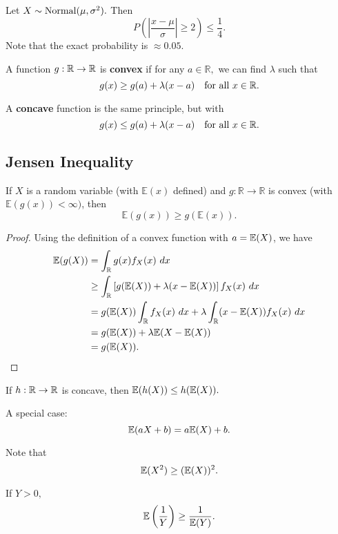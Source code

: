 \begin{eg}
Let $X\sim \operatorname*{Normal}(\mu,\sigma^2).$ Then 
$$
P\left(\left|\frac{x-\mu}{\sigma}\right| \geq 2\right) \leq \frac14.
$$
Note that the exact probability is $\approx 0.05$.
\end{eg}

\begin{definition}
A function $g:\mathbb R \to \mathbb R$ is \textbf{convex} if for any $a\in \mathbb R,$ we can find $\lambda$ such that
$$
g(x)\geq g(a)+\lambda(x-a) \quad \text{for all } x\in \mathbb R.
$$
\end{definition}
A \textbf{concave} function is the same principle, but with 
$$g(x)\leq g(a)+\lambda(x-a) \quad \text{for all } x\in \mathbb R.$$


\subsection{Jensen Inequality}
\begin{theorem}
If $X$ is a random variable (with $\mathbb E(x)$ defined) and $g:\mathbb R \to \mathbb R$ is convex (with $\mathbb E(g(x))<\infty)$, then 
$$
\mathbb E(g(x))\geq g(\mathbb E(x)).
$$
\end{theorem}

\begin{proof}
Using the definition of a convex function with $a=\mathbb E(X)$, we have
\begin{align*}
    \EE(g(X))&=\intR g(x) f_X(x)\ dx \\
    &\geq \intR \left[g(\EE(X))+\lambda (x-\EE(X))\right] f_X(x) \ dx \\
    &= g(\EE(X))\intR f_X(x) \ dx + \lambda \intR (x-\EE(X)) f_X(x) \ dx \\
    &= g(\EE(X)) +\lambda \EE(X-\EE(X)) \\
    &= g(\EE(X)).
\end{align*}
\end{proof}
	
If $h:\mathbb R \to \mathbb R$ is concave, then $\mathbb E(h(X))\leq h(\mathbb E(X)).$
\begin{eg}
A special case:
$$\mathbb E(aX+b)=a\mathbb E(X)+b.$$
\end{eg}
\begin{eg}
Note that
$$
\mathbb E(X^2)\geq (\mathbb E(X))^2.
$$
\end{eg}
\begin{eg}
If $Y>0,$ $$\mathbb E\left(\frac{1}{Y}\right)\geq \frac{1}{\mathbb E(Y)}.$$
\end{eg}

